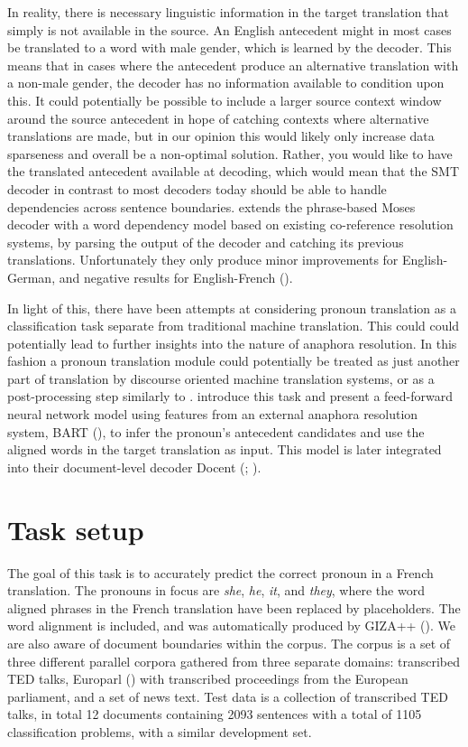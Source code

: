 \documentclass[11pt]{article}
\begin{document}
In reality, there is necessary linguistic information in the target translation that simply is not available in the source.
An English antecedent might in most cases be translated to a word with male gender, which is learned by the decoder.
This means that in cases where the antecedent produce an alternative translation with a non-male gender, the decoder has no information available to condition upon this.
It could potentially be possible to include a larger source context window around the source antecedent in hope of catching contexts where alternative translations are made, but in our opinion this would likely only increase data sparseness and overall be a non-optimal solution.
Rather, you would like to have the translated antecedent available at decoding, which would mean that the SMT decoder in contrast to most decoders today should be able to handle dependencies across sentence boundaries.
\textcite{Hardmeier2010Modelling} extends the phrase-based Moses decoder with a word dependency model based on existing co-reference resolution systems, by parsing the output of the decoder and catching its previous translations.
Unfortunately they only produce minor improvements for English-German, and negative results for English-French (\cite{Hardmeier2011UppsalaFbk}).

In light of this, there have been attempts at considering pronoun translation as a classification task separate from traditional machine translation.
This could  could potentially lead to further insights into the nature of anaphora resolution.
In this fashion a pronoun translation module could potentially be treated as just another part of translation by discourse oriented machine translation systems, or as a post-processing step similarly to \textcite{Guillou2012Improving}.
\textcite{Hardmeier2013Latent} introduce this task and present a feed-forward neural network model using features from an external anaphora resolution system, BART (\cite{Broscheit2010Bart}), to infer the pronoun's antecedent candidates and use the aligned words in the target translation as input. This model is later integrated into their document-level decoder Docent (\cite[chapter~9]{Hardmeier2014Discoursea}; \cite{Hardmeier2013Docent}).

\section{Task setup}

The goal of this task is to accurately predict the correct pronoun in a French translation.
The pronouns in focus are \emph{she}, \emph{he}, \emph{it}, and \emph{they}, where the word aligned phrases in the French translation have been replaced by placeholders.
The word alignment is included, and was automatically produced by GIZA++ (\cite{Och2003Giza}).
We are also aware of document boundaries within the corpus.
The corpus is a set of three different parallel corpora gathered from three separate domains:
transcribed TED talks, Europarl (\cite{Koehn2005Europarl}) with transcribed proceedings from the European parliament, and a set of news text.
Test data is a collection of transcribed TED talks, in total 12 documents containing 2093 sentences with a total of 1105 classification problems, with a similar development set.
\end{document}
